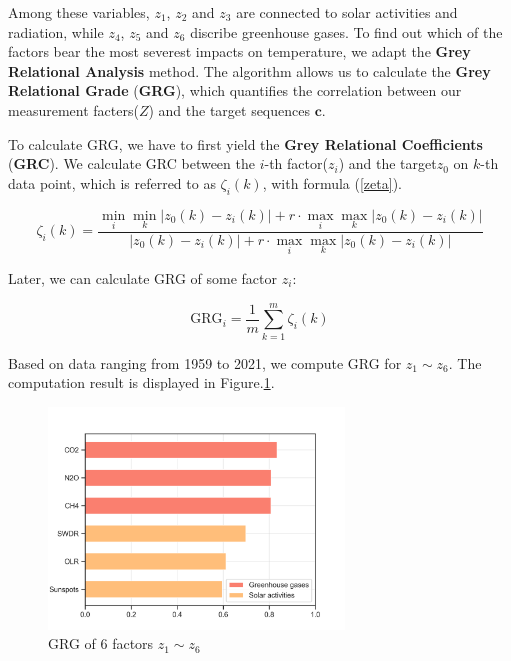 \documentclass[12pt]{article}
\begin{document}
Among these variables, $z_1$, $z_2$ and $z_3$ are connected to solar activities and radiation, while $z_4$, $z_5$ and $z_6$ discribe greenhouse gases. To find out which of the factors bear the most severest impacts on temperature, we adapt the \textbf{Grey Relational Analysis} method. The algorithm allows us to calculate the \textbf{Grey Relational Grade} (\textbf{GRG}), which quantifies the correlation between our measurement facters($Z$) and the target sequences $\boldsymbol{c}$. 

To calculate GRG, we have to first yield the \textbf{Grey Relational Coefficients}  (\textbf{GRC}). We calculate GRC between the $i$-th factor($z_i$) and the target$z_0$ on $k$-th data point, which is referred to as $\zeta_i(k)$, with formula (\ref{zeta}).

\begin{equation}
    \label{zeta}
    \zeta_i(k) = \frac{
        \min_i \min_k | z_0(k) - z_i(k) | + r \cdot
        \max_i \max_k | z_0(k) - z_i(k) |
    }{
        | z_0(k) - z_i(k) | + r \cdot
        \max_i \max_k | z_0(k) - z_i(k) |
    }
\end{equation}

Later, we can calculate GRG of some factor $z_i$:

\begin{equation}
    \text{GRG}_i = \frac 1 m \sum\limits_{k=1}^m \zeta_i(k)
\end{equation}

Based on data ranging from 1959 to 2021, we compute GRG for $z_1 \sim z_6$. The computation result is displayed in Figure.\ref{GRG}.

\begin{figure}[hbt]
    \centering
    \includegraphics[width = 0.7\textwidth]{fig/original_2b.png}
    \caption{GRG of 6 factors $z_1 \sim z_6$}
    \label{GRG}
\end{figure}
\end{document}
